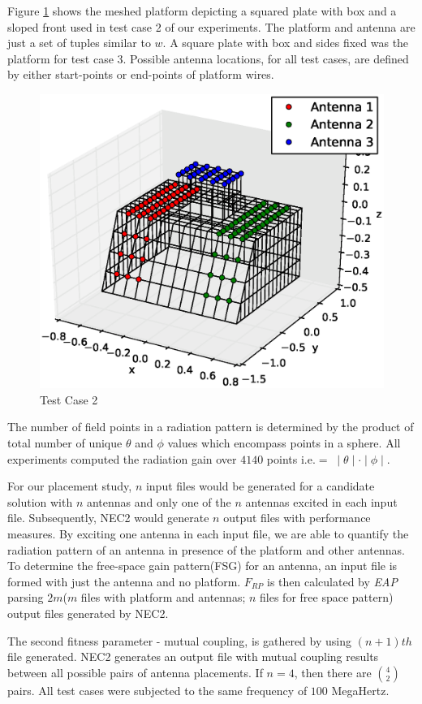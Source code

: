\documentclass[conference]{IEEEtran}
\begin{document}
Figure \ref{fig:plat2} shows the meshed platform depicting a squared plate with box and a sloped front used in test case 2 of our experiments. The platform and antenna are just a set of tuples similar to $w$. A square plate with box and sides fixed was the platform for test case 3. Possible antenna locations, for all test cases, are defined by either start-points or end-points of platform wires.  
\begin{figure}
    \begin{center}
        \includegraphics[width=.41\textwidth]{FIG/tc_2_figure}
\end{center}
\caption{Test Case 2}
\label{fig:plat2}
\end{figure}

The number of field points in a radiation pattern is determined by the product of total number of unique $\theta$ and $\phi$ values which encompass points in a sphere. All experiments computed the radiation gain over $4140$ points i.e.$ = \; \mid \theta \mid \cdot \mid \phi \mid$.

For our placement study, $n$ input files would be generated for a candidate solution with $n$ antennas and only one of the $n$ antennas excited in each input file. Subsequently, NEC2 would generate $n$ output files with performance measures. By exciting one antenna in each input file, we are able to quantify the radiation pattern of an antenna in presence of the platform and other antennas. To determine the free-space gain pattern(FSG) for an antenna, an input file is formed with just the antenna and no platform. $F_{RP}$ is then calculated by \textit{EAP} parsing $2m$($m$ files with platform and antennas; $n$ files for free space pattern) output files generated by NEC2.

The second fitness parameter - mutual coupling, is gathered by using $(n+1)th$ file generated. NEC2 generates an output file with mutual coupling results between all possible pairs of antenna placements. If $n=4$, then there are $\binom{4}{2}$ pairs. All test cases were subjected to the same frequency of $100$ MegaHertz.
\end{document}
